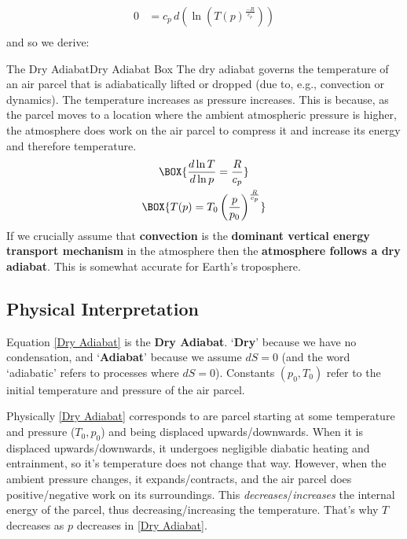 \begin{align*}
    0 & = c_p\,d\left(\ln \left(T(p)^\frac{-R}{c_p}\right)\right)\\
\end{align*}
and so we derive:
\begin{fact}{The Dry Adiabat}{Dry Adiabat Box}\label{Dry Adiabat Box}
The dry adiabat governs the temperature of an air parcel that is adiabatically lifted or dropped (due to, e.g., convection or dynamics). The temperature increases as pressure increases. This is because, as the parcel moves to a location where the ambient atmospheric pressure is higher, the atmosphere does work on the air parcel to compress it and increase its energy and therefore temperature.
    \begin{gather}
    \label{Dry Adiabat Slope}
    \BOX{
        \frac{d\ln T}{d\ln p}=\frac{R}{c_p}
    }\\
    \label{Dry Adiabat}
    \BOX{
        T(p)=T_0\left(\frac{p}{p_0}\right)^\frac{R}{c_p}
    }
    \end{gather}
If we crucially assume that \textbf{convection} is the \textbf{dominant vertical energy transport mechanism} in the atmosphere then the \textbf{atmosphere follows a dry adiabat}. This is somewhat accurate for Earth's troposphere.
\end{fact}
\subsection{Physical Interpretation}

Equation \ref{Dry Adiabat} is the \textbf{Dry Adiabat}. `\textbf{Dry}' because we have no condensation, and `\textbf{Adiabat}' because we assume $dS=0$ (and the word `adiabatic' refers to processes where $dS=0$). Constants $(p_0,T_0)$ refer to the initial temperature and pressure of the air parcel. 

Physically \ref{Dry Adiabat} corresponds to are parcel starting at some temperature and pressure ($T_0,p_0$) and being displaced upwards/downwards. When it is displaced upwards/downwards, it undergoes negligible diabatic heating and entrainment, so it's temperature does not change that way. However, when the ambient pressure changes, it expands/contracts, and the air parcel does positive/negative work on its surroundings. This \textit{decreases}/\textit{increases} the internal energy of the parcel, thus decreasing/increasing the temperature. That's why $T$ decreases as $p$ decreases in \ref{Dry Adiabat}. 

